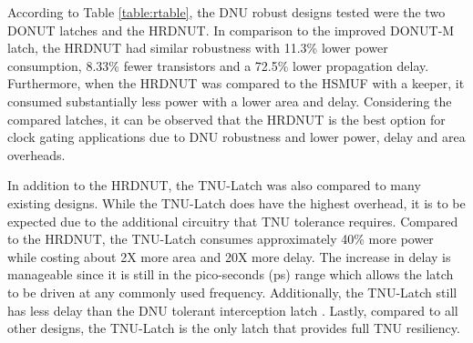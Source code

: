 According to Table \ref{table:rtable}, the DNU robust designs tested were the two DONUT latches and the HRDNUT. In comparison to the improved DONUT-M latch, the HRDNUT had similar robustness with 11.3\% lower power consumption, 8.33\% fewer transistors and a 72.5\% lower propagation delay. Furthermore, when the HRDNUT was compared to the HSMUF with a keeper, it consumed substantially less power with a lower area and delay. Considering the compared latches, it can be observed that the HRDNUT is the best option for clock gating applications due to DNU robustness and lower power, delay and area overheads.

In addition to the HRDNUT, the TNU-Latch was also compared to many existing designs. While the TNU-Latch does have the highest overhead, it is to be expected due to the additional circuitry that TNU tolerance requires. Compared to the HRDNUT, the TNU-Latch consumes approximately 40\% more power while costing about 2X more area and 20X more delay. The increase in delay is manageable since it is still in the pico-seconds (ps) range which allows the latch to be driven at any commonly used frequency. Additionally, the TNU-Latch still has less delay than the DNU tolerant interception latch \cite{Inter}. Lastly, compared to all other designs, the TNU-Latch is the only latch that provides full TNU resiliency.